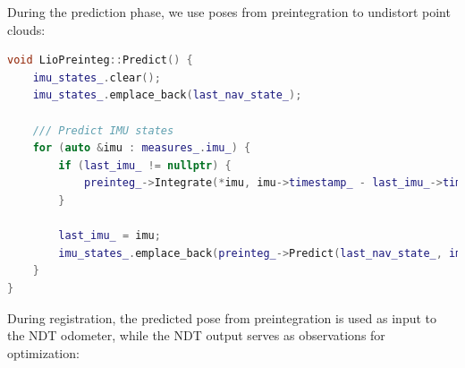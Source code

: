 During the prediction phase, we use poses from preintegration to undistort point clouds:

\begin{lstlisting}[language=c++,caption=src/ch8/lio-preinteg/lio_preinteg.cc]
void LioPreinteg::Predict() {
	imu_states_.clear();
	imu_states_.emplace_back(last_nav_state_);
	
	/// Predict IMU states
	for (auto &imu : measures_.imu_) {
		if (last_imu_ != nullptr) {
			preinteg_->Integrate(*imu, imu->timestamp_ - last_imu_->timestamp_);
		}
		
		last_imu_ = imu;
		imu_states_.emplace_back(preinteg_->Predict(last_nav_state_, imu_init_.GetGravity()));
	}
}
\end{lstlisting}

During registration, the predicted pose from preintegration is used as input to the NDT odometer, while the NDT output serves as observations for optimization:

